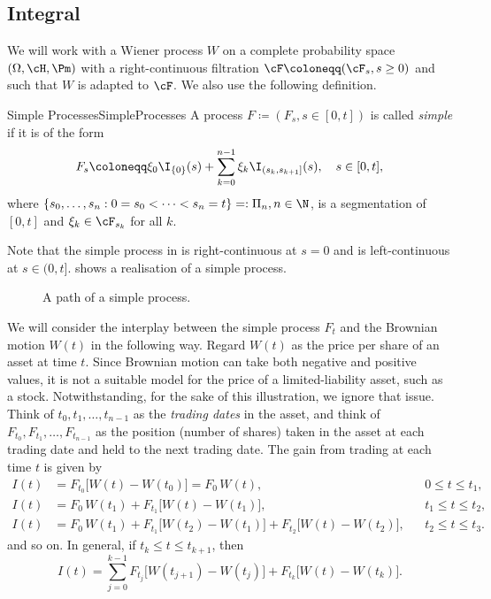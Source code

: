 \subsection{\Ito{} Integral}
We will work with a Wiener process $W$ on a complete probability space $(\Omega, \cH, \Pm)$ with a right-continuous filtration $\cF \coloneqq (\cF_s, s \ge 0)$ and such that $W$ is adapted to $\cF$. We also use the following definition.

\begin{defn}{Simple Processes}{SimpleProcesses}
	A process $F \coloneqq (F_s, s \in [0, t])$ is called \emph{simple} if it is of the form
	\begin{equation}\label{eq:SimpleProcessDef}
		F_s \coloneqq \xi_0 \I_{\{0\}}(s) + \sum_{k=0}^{n-1} \xi_k \I_{(s_k, s_{k+1}]}(s), \quad s \in [0, t],
	\end{equation}
	where $\{s_0, \dots, s_n : 0 = s_0 < \dots < s_n = t\} =: \Pi_n, n \in \N$, is a segmentation of $[0, t]$ and $\xi_k \in \cF_{s_k}$ for all $k$.
\end{defn}

Note that the simple process in  is right-continuous at $s = 0$ and is left-continuous at $s \in (0, t]$.  shows a realisation of a simple process.

\begin{figure}[H]
	\centering
	
	\caption{A path of a simple process.}
	\label{fig:SimpleProcessPath}
\end{figure}

We will consider the interplay between the simple process $F_t$ and the Brownian motion $W(t)$ in the following way. Regard $W(t)$ as the price per share of an asset at time $t$. Since Brownian motion can take both negative and positive values, it is not a suitable model for the price of a limited-liability asset, such as a stock. Notwithstanding, for the sake of this illustration, we ignore that issue. Think of $t_0, t_1, \dots, t_{n-1}$ as the \textit{trading dates} in the asset, and think of $F_{t_0}, F_{t_1}, \dots, F_{t_{n-1}}$ as the position (number of shares) taken in the asset at each trading date and held to the next trading date. The gain from trading at each time $t$ is given by
\begin{align}
	I(t) & = F_{t_0}\big[W(t) - W(t_0)\big] = F_0\,W(t),                                      &  & 0 \le t \le t_1,   \\
	I(t) & = F_0\,W(t_1) + F_{t_1}\big[W(t) - W(t_1)\big],                                    &  & t_1 \le t \le t_2, \\
	I(t) & = F_0\,W(t_1) + F_{t_1}\big[W(t_2) - W(t_1)\big] + F_{t_2}\big[W(t) - W(t_2)\big], &  & t_2 \le t \le t_3.
\end{align}
and so on. In general, if $t_k \le t \le t_{k+1}$, then
\begin{equation}\label{eq:TradingGain}
	I(t) = \sum_{j=0}^{k-1} F_{t_j}\big[W(t_{j+1}) - W(t_j)\big] + F_{t_k}\big[W(t) - W(t_k)\big].
\end{equation}

